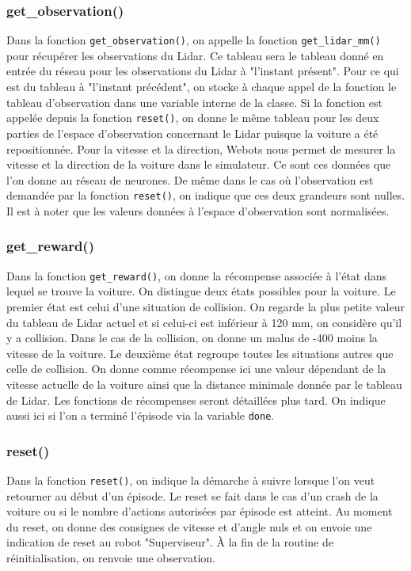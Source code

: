\documentclass[french]{article}
\begin{document}
\subsubsection*{get\_observation()}
Dans la fonction \texttt{get\_observation()}, on appelle la fonction \texttt{get\_lidar\_mm()} pour récupérer 
les observations du Lidar. Ce tableau sera le tableau donné en entrée du réseau pour les observations du Lidar 
à "l'instant présent". Pour ce qui est du tableau à "l'instant précédent", on stocke à chaque appel de la 
fonction le tableau d'observation dans une variable interne de la classe. Si la fonction est appelée depuis 
la fonction \texttt{reset()}, on donne le même tableau pour les deux parties de l'espace d'observation concernant 
le Lidar puisque la voiture a été repositionnée. Pour la vitesse et la direction, Webots nous permet de mesurer 
la vitesse et la direction de la voiture dans le simulateur. Ce sont ces données que l'on donne au réseau de neurones. 
De même dans le cas où l'observation est demandée par la fonction \texttt{reset()}, on indique que ces deux grandeurs 
sont nulles. Il est à noter que les valeurs données à l'espace d'observation sont normalisées.

\subsubsection*{get\_reward()}
Dans la fonction \texttt{get\_reward()}, on donne la récompense associée à l'état dans lequel se trouve la voiture. 
On distingue deux états possibles pour la voiture. Le premier état est celui d'une situation de collision. 
On regarde la plus petite valeur du tableau de Lidar actuel et si celui-ci est inférieur à 120 mm, on considère 
qu'il y a collision. Dans le cas de la collision, on donne un malus de -400 moins la vitesse de la voiture. 
Le deuxième état regroupe toutes les situations autres que celle de collision. On donne comme récompense ici 
une valeur dépendant de la vitesse actuelle de la voiture ainsi que la distance minimale donnée par le tableau de Lidar. 
Les fonctions de récompenses seront détaillées plus tard. On indique aussi ici si l'on a terminé l'épisode via la 
variable \texttt{done}.

\subsubsection*{reset()}
Dans la fonction \texttt{reset()}, on indique la démarche à suivre lorsque l'on veut retourner au début d'un épisode. 
Le reset se fait dans le cas d'un crash de la voiture ou si le nombre d'actions autorisées par épisode est atteint. 
Au moment du reset, on donne des consignes de vitesse et d'angle nuls et on envoie une indication de reset au robot 
"Superviseur". À la fin de la routine de réinitialisation, on renvoie une observation.
\end{document}
